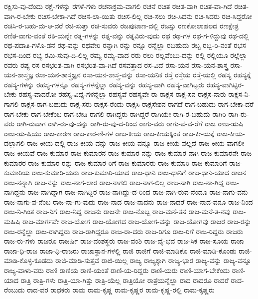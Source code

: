 {ರಕ್ಷಿಸು-ವು-ದೆಂದು
ರಕ್ಷೆ-ಗಳನ್ನು
ರಗಳೆ-ಗಳು
ರಚನಾಕ್ರಮ-ವಾಗಲಿ
ರಚನೆ
ರಚಿತ
ರಚಿತ-ವಾಗಿ
ರಚಿತ-ವಾ-ಗಿದೆ
ರಚಿತ-ವಾಗಿ-ರ-ಬೇಕು
ರಚಿಸ-ಬೇಕಾ-ಗಿದೆ
ರಚಿಸ-ಲಾ-ಯಿತು
ರಚಿಸ-ಲಿಲ್ಲ
ರಚಿ-ಸಲು
ರಚಿ-ಸಿದನು
ರಚಿ-ಸಿದರು
ರಚಿ-ಸಿದ್ದರೋ
ರಚಿಸಿ-ರ-ಬಹು-ದು-ಆ-ದರೆ
ರಚಿ-ಸುತ್ತಾ
ರಚಿ-ಸುವರು
ರಜಪುಟಾಣ-ದಲ್ಲಿ
ರಜಸ್ಸು
ರಣಕೋಲಾಹಲದ
ರಣಕ್ಷೇತ್ರ
ರಣಿತ-ವಾಗು-ವಂತೆ
ರತಿ-ಯನ್ನೇ
ರತ್ನ-ಗಳನ್ನು
ರತ್ನ-ವನ್ನು
ರತ್ನವಿರು-ವುದು
ರಥ
ರಥ-ಗಳ
ರಥ-ಗ-ಳಿದ್ದುವು
ರಥ-ದಲ್ಲಿ
ರಥ-ಪದಾತಿ-ಗಳೊ-ಡನೆ
ರಥ-ವನ್ನು
ರಥವೇರಿ
ರನ್ನಾಗಿ
ರನ್ನು
ರನ್ನೂ
ರನ್ನೆಲ್ಲಾ
ರಬಹುದು
ರಬ್ಬ
ರಬ್ಬ-ರಿ-ನಂತೆ
ರಭಸ
ರಭಸ-ದಿಂದ
ರಭ್ಯ
ರಮಿ-ಸುವು-ದಿ-ಲಿಲ್ಲ
ರಮ್ಯ
ರಮ್ಯ-ವಾದ
ರರು
ರಲು
ರಲ್ಲವೆಂಬು-ದನ್ನು
ರಲ್ಲಿ
ರಲ್ಲಿಯೂ
ರಲ್ಲೆಲ್ಲಾ
ರವರು
ರಷ್ಯ
ರಸ
ರಸಭರಿತ-ವಾಗಿ
ರಸಭರಿತ-ವಾ-ಗಿದೆ
ರಸವತ್ತಾದ
ರಸ-ವಿದೆ
ರಸಾ-ಯನ
ರಸಾ-ಯನ-ಶಾಸ್ತ್ರ
ರಸಾ-ಯನ-ಶಾಸ್ತ್ರಜ್ಞ
ರಸಾ-ಯನ-ಶಾಸ್ತ್ರಜ್ಞನ
ರಸಾ-ಯನ-ಶಾಸ್ತ್ರ-ವನ್ನು
ರಸಾ-ಯನಿಕ
ರಸ್ತೆ
ರಸ್ತೆಯ
ರಸ್ತೆ-ಯಲ್ಲಿ
ರಹಸ್ಯ
ರಹಸ್ಯಕ್ಕೆ
ರಹಸ್ಯ-ಗಳನ್ನು
ರಹಸ್ಯ-ಗಳನ್ನೂ
ರಹಸ್ಯ-ಗಳನ್ನೆಲ್ಲಾ
ರಹಸ್ಯ-ವನ್ನು
ರಹಸ್ಯ-ವಾಗಿ
ರಹಸ್ಯ-ವಾಗಿಟ್ಟರು
ರಹಸ್ಯ-ವಾಗಿಟ್ಟಿರ-ಬೇಕು
ರಹಸ್ಯ-ವಾದರೋ
ರಹಸ್ಯ-ವಿದ್ಯೆ-ಗಳನ್ನೆಲ್ಲಾ
ರಹಸ್ಯವೆ
ರಹಸ್ಯವೇ
ರಾ
ರಾಕ್ಷಸ
ರಾಕ್ಷ-ಸನ
ರಾಕ್ಷಸ-ನಾರು
ರಾಕ್ಷಸ-ನಿ-ಗಾಗಲಿ
ರಾಕ್ಷಸ-ರಾಗ-ಬಹುದು
ರಾಕ್ಷ-ಸರು
ರಾಕ್ಷಸ-ರೆಂದು
ರಾಕ್ಷಸಿ
ರಾಕ್ಷಸೇಶನ
ರಾಗದೆ
ರಾಗ-ಬಹುದು
ರಾಗ-ಬೇಕಾ-ದರೆ
ರಾಗ-ಬೇಕು
ರಾಗ-ಬೇಕೆಂಬ
ರಾಗ-ಬೇಡಿ
ರಾಗಲಿ
ರಾಗಿದ್ದರು
ರಾಗಿದ್ದರೆ
ರಾಗಿಯೇ
ರಾಗಿ-ರ-ಬಹುದು
ರಾಗಿರಿ
ರಾಗಿ-ರು-ವರು
ರಾಗಿ-ರುವಾಗ
ರಾಗಿ-ರು-ವು-ದನ್ನು
ರಾಗಿ-ರು-ವು-ದ-ರಿಂದ
ರಾಗು-ವರು
ರಾಗು-ವ-ವ-ರೆಗೆ
ರಾಜ
ರಾಜ-ಋಷಿ
ರಾಜ-ಋ-ಷಿಯು
ರಾಜ-ಕಾರಣ
ರಾಜ-ಕಾರ-ಣಿ-ಗಳ
ರಾಜ-ಕೀಯ
ರಾಜ-ಕೀಯಕ್ಕಿಂತ
ರಾಜ-ಕೀ-ಯಕ್ಕೆ
ರಾಜ-ಕೀಯ-ದಲ್ಲಾಗಲಿ
ರಾಜ-ಕೀಯ-ದಲ್ಲಿ
ರಾಜ-ಕೀಯ-ವನ್ನು
ರಾಜ-ಕೀಯ-ವನ್ನೂ
ರಾಜ-ಕೀಯ-ವಲ್ಲದೆ
ರಾಜ-ಕೀಯ-ವಾಗಲೀ
ರಾಜ-ಕೀಯವೆ
ರಾಜ-ಕುಮಾರ
ರಾಜ-ಕುಮಾರನ
ರಾಜ-ಕುಮಾರ-ನನ್ನು
ರಾಜ-ಕುಮಾರ-ನಾಗಿ
ರಾಜ-ಕುಮಾರನೇ
ರಾಜ-ಕುಮಾರರ
ರಾಜ-ಕುಮಾರ-ರನ್ನು
ರಾಜ-ಕುಮಾರ-ರಿಗೆ
ರಾಜ-ಕುಮಾರರು
ರಾಜ-ಕುಮಾರಿ
ರಾಜ-ಕುಮಾರಿಗೆ
ರಾಜ-ಕುಮಾರಿಯ
ರಾಜ-ಕುಮಾರಿ-ಯರು
ರಾಜ-ಕುಮಾರಿ-ಯಾದ
ರಾಜ-ಧಾನಿ
ರಾಜ-ಧಾನಿಗೆ
ರಾಜ-ಧಾನಿ-ಯಾದ
ರಾಜನ
ರಾಜ-ನನ್ನಾಗಿ
ರಾಜ-ನನ್ನು
ರಾಜ-ನಾಗ-ಲಾರ
ರಾಜ-ನಾಗಲಿ
ರಾಜ-ನಾಗ-ಲಿಲ್ಲ
ರಾಜ-ನಾಗಿ
ರಾಜ-ನಾ-ಗಿದ್ದ
ರಾಜ-ನಾಗಿದ್ದನು
ರಾಜ-ನಾಗಿದ್ದಾಗ
ರಾಜ-ನಾಗಿದ್ದಿರ
ರಾಜ-ನಾಗಿದ್ದು-ದ-ರಿಂದ
ರಾಜ-ನಾಗಿ-ರುವ-ನೆಂದೂ
ರಾಜ-ನಾಗು-ವನು
ರಾಜ-ನಾಗು-ವ-ನೆಂಬ
ರಾಜ-ನಾ-ಗು-ವುದು
ರಾಜ-ನಾದ
ರಾಜ-ನಾದನು
ರಾಜ-ನಾದರೆ
ರಾಜ-ನಾದ-ವನೂ
ರಾಜ-ನಿಂದ
ರಾಜ-ನಿ-ಗಿಂತ
ರಾಜ-ನಿಗೆ
ರಾಜ-ನಿದ್ದ
ರಾಜನು
ರಾಜನೇ
ರಾಜ-ನೊಬ್ಬ
ರಾಜ-ಮನೆ-ತನ
ರಾಜ-ಮನೆ-ತ-ನವು
ರಾಜ-ಮಹಿಷಿ
ರಾಜ-ಮಾರ್ಗವೇ
ರಾಜ-ಯೋಗ
ರಾಜ-ಯೋಗದ
ರಾಜ-ಯೋಗ-ವನ್ನು
ರಾಜ-ಯೋಗವು
ರಾಜರ
ರಾಜ-ರನ್ನು
ರಾಜ-ರನ್ನೆಲ್ಲಾ
ರಾಜ-ರಾಗಿದ್ದರು
ರಾಜ-ರಾಗಿದ್ದರೂ
ರಾಜ-ರಾ-ದರು
ರಾಜ-ರಿಗೂ
ರಾಜ-ರಿಗೆ
ರಾಜ-ರಿದ್ದರು
ರಾಜರು
ರಾಜ-ರು-ಗಳು
ರಾಜರೂ
ರಾಜರ್ಷಿ
ರಾಜ-ವಂಶಸ್ಥರು
ರಾಜ-ವಂಶಿ
ರಾಜ-ವೈ-ಭವ
ರಾಜ-ಸಿಕ
ರಾಜ-ಸೂಯ
ರಾಜಾ
ರಾಜಾ-ಧಿ-ರಾಜ
ರಾಜಾ-ಧಿ-ರಾಜರು
ರಾಜಾಸ್ಥಾನ-ಗಳಲ್ಲಿ
ರಾಜಿ
ರಾಜಿಗೆ
ರಾಜಿ-ಮಾಡಿಕೊ
ರಾಜಿ-ಮಾಡಿ-ಕೊಂಡು
ರಾಜಿ-ಮಾಡಿ-ಕೊಳ್ಳ-ಕೂಡದು
ರಾಜಿ-ಮಾಡಿ-ಸುತ್ತವೆ
ರಾಜಿ-ಯಿಲ್ಲ
ರಾಜ್ಯ
ರಾಜ್ಯಕ್ಕಾಗಿ
ರಾಜ್ಯ-ಭಾರ
ರಾಜ್ಯ-ವನ್ನು
ರಾಜ್ಯ-ವನ್ನೂ
ರಾಜ್ಯ-ವಾಳು-ವರು
ರಾಣಿ
ರಾಣಿಯ
ರಾಣಿ-ಯಂತೆ
ರಾಣಿ-ಯ-ರಿದ್ದರು
ರಾಣಿ-ಯರು
ರಾಣಿ-ಯಾಗ-ಬೇಕೆಂದು
ರಾಣಿ-ಯಾದ
ರಾತ್ರಿ
ರಾತ್ರಿ-ಗಳು
ರಾತ್ರಿ-ಯಾ-ಗಿತ್ತು
ರಾತ್ರಿ-ಯೆಲ್ಲ
ರಾತ್ರಿಯೋ
ರಾತ್ರೆಯನ್ನೆಲ್ಲಾ
ರಾದ
ರಾದರೂ
ರಾದರೆ
ರಾದ-ರೆಂಬುದು
ರಾದ-ವರ
ರಾಧಕರು
ರಾಮ
ರಾಮ-ಕೃಷ್ಣ
ರಾಮ-ಕೃಷ್ಣರ
ರಾಮ-ಕೃಷ್ಣ-ರಲ್ಲಿ
ರಾಮ-ಕೃಷ್ಣರು
}

